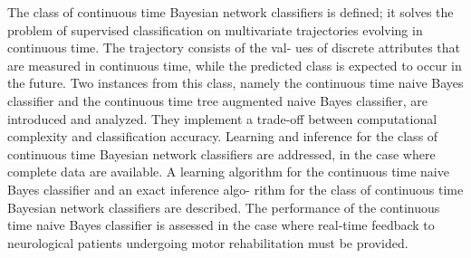 The class of continuous time Bayesian network classifiers is defined; it solves the problem of supervised classification on multivariate trajectories evolving in continuous time. The trajectory consists of the val- ues of discrete attributes that are measured in continuous time, while the predicted class is expected to occur in the future. Two instances from this class, namely the continuous time naive Bayes classifier and the continuous time tree augmented naive Bayes classifier, are introduced and analyzed. They implement a trade-off between computational complexity and classification accuracy. Learning and inference for the class of continuous time Bayesian network classifiers are addressed, in the case where complete data are available. A learning algorithm for the continuous time naive Bayes classifier and an exact inference algo- rithm for the class of continuous time Bayesian network classifiers are described. The performance of the continuous time naive Bayes classifier is assessed in the case where real-time feedback to neurological patients undergoing motor rehabilitation must be provided.

